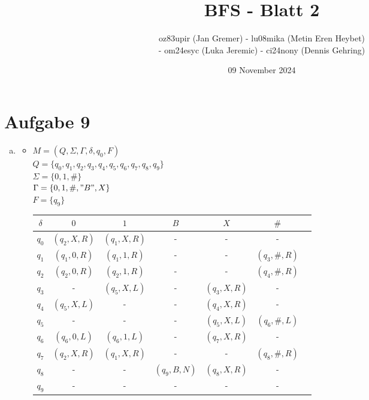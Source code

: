\documentclass[11pt]{article}
\title{BFS - Blatt 2}
\author{oz83upir (Jan Gremer) - lu08mika (Metin Eren Heybet)\\
 - om24esyc (Luka Jeremic) - ci24nony (Dennis Gehring)}
\date{09 November 2024}
\begin{document}
\maketitle
\section*{Aufgabe 9}

\begin{enumerate}[(a)]
    \item \begin{itemize}
        \item $ M = (Q, \Sigma, \Gamma, \delta, q_0, F) $ \\
        $ Q = \{ q_0, q_1, q_2, q_3, q_4, q_5, q_6, q_7, q_8, q_9 \} $ \\
        $ \Sigma = \{0, 1, \# \} $ \\
        $ \Gamma = \{0, 1, \#, "B", X\} $\\
        $ F = \{q_9\}$

        \begin{table}[h!]
           \centering
            \renewcommand{\arraystretch}{1.33}
            \begin{tabular}{c|cccccc}
            
                $\delta$ & $0$ & $1$ & $B$ & $X$ & $\#$ \\ \hline
                $q_0$ & $(q_2, X, R)$ & $(q_1, X, R)$ & - & - & - \\
                $q_1$ & $(q_1, 0, R)$ & $(q_1, 1, R)$ & - & - & $(q_3, \#, R)$ \\
                $q_2$ & $(q_2, 0, R)$ & $(q_2, 1, R)$ & - & - & $(q_4, \#, R)$ \\
                $q_3$ & - & $(q_5, X, L)$ & - & $(q_3, X, R)$ & - \\ 
                $q_4$ & $(q_5, X, L)$ & - & - & $(q_4, X, R)$ & - \\ 
                $q_5$ & - & - & - & $(q_5, X, L)$ & $(q_6, \#, L)$ \\ 
                $q_6$ & $(q_6, 0, L)$ & $(q_6, 1, L)$ & - & $(q_7, X, R)$ & - \\ 
                $q_7$ & $(q_2, X, R)$ & $(q_1, X, R)$ & - & - & $(q_8, \#, R)$ \\ 
                $q_8$ & - & - & $(q_9, B, N)$ & $(q_8, X, R)$ & - \\ 
                $q_9$ & - & - & - & - & - \\
            \end{tabular}
        \end{table}


\end{itemize}
\end{enumerate}
\end{document}
